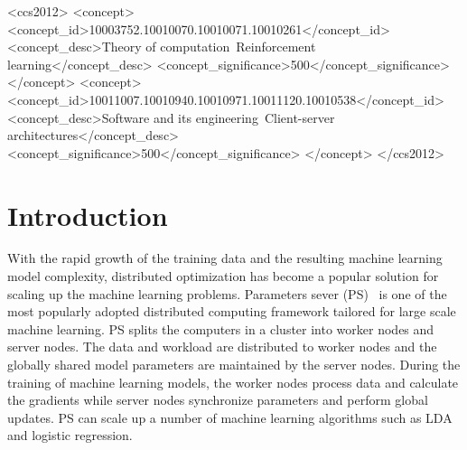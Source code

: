 \documentclass[sigconf]{acmart}
\begin{document}
\begin{CCSXML}
	<ccs2012>
	<concept>
	<concept_id>10003752.10010070.10010071.10010261</concept_id>
	<concept_desc>Theory of computation~Reinforcement learning</concept_desc>
	<concept_significance>500</concept_significance>
	</concept>
	<concept>
	<concept_id>10011007.10010940.10010971.10011120.10010538</concept_id>
	<concept_desc>Software and its engineering~Client-server architectures</concept_desc>
	<concept_significance>500</concept_significance>
	</concept>
	</ccs2012>
\end{CCSXML}




\maketitle

  \section{Introduction}\label{sec:Intro}

 With the rapid growth of the training data and the resulting machine learning model complexity, distributed optimization has become a popular solution for scaling up the machine learning problems. Parameters sever (PS)~\cite{li2014scaling} is one of the most popularly adopted distributed computing framework tailored for large scale machine learning. PS splits the computers in a cluster into worker nodes and server nodes. The data and workload are distributed to worker nodes and the globally shared model parameters are maintained by the server nodes. During the training of machine learning models, the worker nodes process data and calculate the gradients while server nodes synchronize parameters and perform global updates. PS can scale up a number of machine learning algorithms such as LDA and logistic regression.
\end{document}
